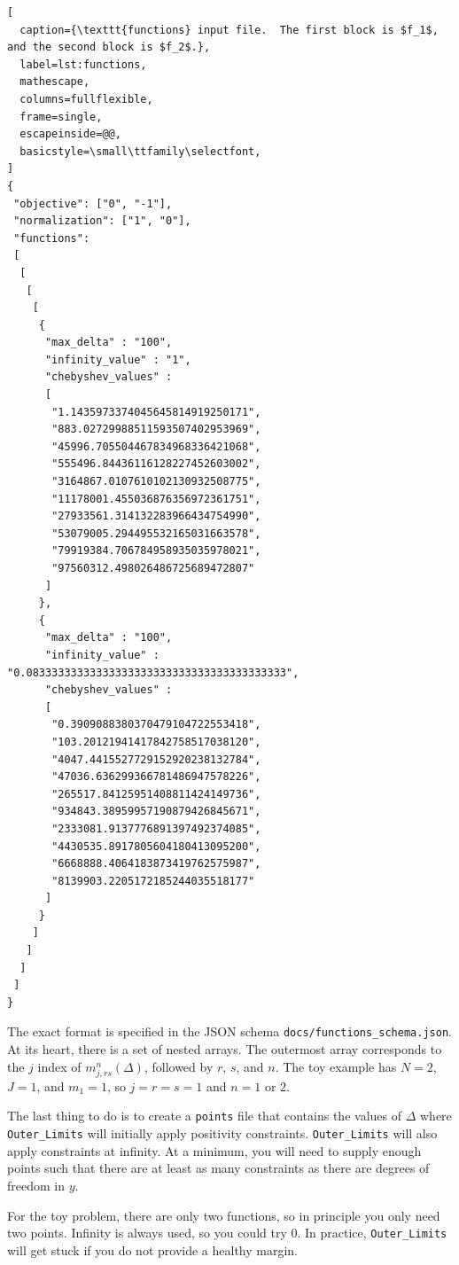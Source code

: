 \documentclass[12pt]{article}
\numberwithin{equation}{section}
\begin{document}
\begin{lstlisting}[
  caption={\texttt{functions} input file.  The first block is $f_1$, and the second block is $f_2$.},
  label=lst:functions,
  mathescape,
  columns=fullflexible,
  frame=single,
  escapeinside=@@,
  basicstyle=\small\ttfamily\selectfont,
]
{
 "objective": ["0", "-1"],
 "normalization": ["1", "0"],
 "functions":
 [
  [
   [
    [
     {
      "max_delta" : "100",
      "infinity_value" : "1",
      "chebyshev_values" :
      [
       "1.1435973374045645814919250171",
       "883.02729988511593507402953969",
       "45996.705504467834968336421068",
       "555496.84436116128227452603002",
       "3164867.0107610102130932508775",
       "11178001.455036876356972361751",
       "27933561.314132283966434754990",
       "53079005.294495532165031663578",
       "79919384.706784958935035978021",
       "97560312.498026486725689472807"
      ]
     },
     {
      "max_delta" : "100",
      "infinity_value" : "0.08333333333333333333333333333333333333333",
      "chebyshev_values" :
      [
       "0.3909088380370479104722553418",
       "103.20121941417842758517038120",
       "4047.4415527729152920238132784",
       "47036.636299366781486947578226",
       "265517.84125951408811424149736",
       "934843.38959957190879426845671",
       "2333081.9137776891397492374085",
       "4430535.8917805604180413095200",
       "6668888.4064183873419762575987",
       "8139903.2205172185244035518177"
      ]
     }
    ]
   ]
  ]
 ]
}
\end{lstlisting}

The exact format is specified in the JSON schema
\texttt{docs/functions\_schema.json}.  At its heart, there is a set of
nested arrays.  The outermost array corresponds to the $j$ index of
$m_{j,rs}^{n}(\Delta)$, followed by $r$, $s$, and $n$.  The toy
example has $N=2$, $J=1$, and $m_{1}=1$, so $j=r=s=1$ and $n=1$ or
$2$.

The last thing to do is to create a \texttt{points} file that contains
the values of $\Delta$ where \texttt{Outer\_Limits} will initially
apply positivity constraints.  \texttt{Outer\_Limits} will also apply
constraints at infinity.  At a minimum, you will need to supply enough
points such that there are at least as many constraints as there are
degrees of freedom in $y$.

For the toy problem, there are only two functions, so in principle you
only need two points.  Infinity is always used, so you could try $0$.
In practice, \texttt{Outer\_Limits} will get stuck if you do not
provide a healthy margin.
\end{document}
